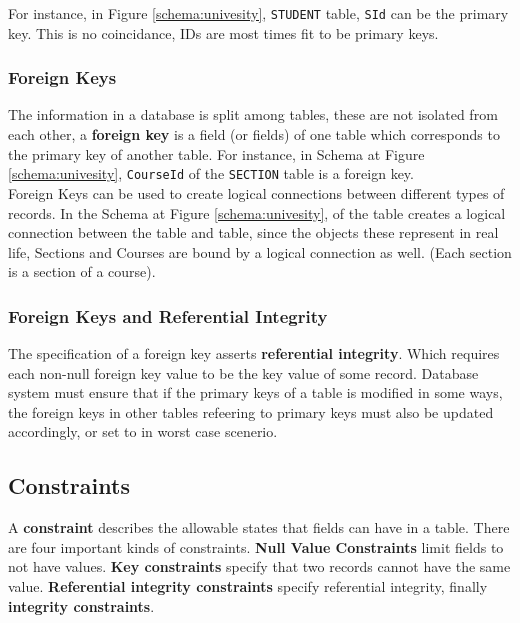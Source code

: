 \documentclass[11pt,a4paper,twocolumn]{book}
\begin{document}
For instance, in Figure \ref{schema:univesity}, \texttt{STUDENT} table, \texttt{SId} can be the primary key. This is no coincidance, IDs are most times fit to be primary keys.

\subsubsection{Foreign Keys}

The information in a database is split among tables, these are not isolated from each other, a \textbf{foreign key} is a field (or fields) of one table which corresponds to the primary key of another table. For instance, in Schema at Figure \ref{schema:univesity}, \texttt{CourseId} of the \texttt{SECTION} table is a foreign key.\\

Foreign Keys can be used to create logical connections between different types of records. In the Schema at Figure \ref{schema:univesity},  of the  table creates a logical connection between the  table and  table, since the objects these represent in real life, Sections and Courses are bound by a logical connection as well. (Each section is a section of a course).

\subsubsection{Foreign Keys and Referential Integrity}

The specification of a foreign key asserts \textbf{referential integrity}. Which requires each non-null foreign key value to be the key value of some record. Database system must ensure that if the primary keys of a table is modified in some ways, the foreign keys in other tables refeering to primary keys must also be updated accordingly, or set to  in worst case scenerio.

\subsection{Constraints}

A \textbf{constraint} describes the allowable states that fields can have in a table. There are four important kinds of constraints. \textbf{Null Value Constraints} limit fields to not have  values. \textbf{Key constraints} specify that two records cannot have the same value. \textbf{Referential integrity constraints} specify referential integrity, finally \textbf{integrity constraints}.
\end{document}
